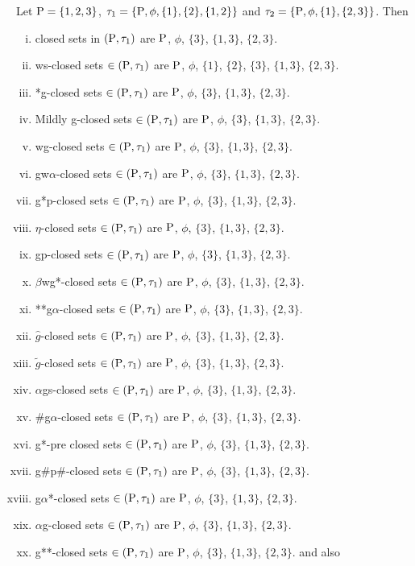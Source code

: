 \begin{exm}\label{exm2.1.8}
Let $\mathrm{P} = \{1, 2, 3\}$, $\tau_{1} = \{\mathrm{P}, \phi, \{1\}, \{2\}, \{1, 2\}\}$ and $\tau_{2} = \{\TSP, \phi, \{1\},\break \{2, 3\}\}$. Then
\begin{enumerate}[(i)]
\item closed sets in $(\mathrm{P}, \tau_{1})$ are $\mathrm{P}$, $\phi$, $\{3\}$, $\{1, 3\}$, $\{2, 3\}$.
\item ws-closed sets $\in(\mathrm{P}, \tau_{1})$ are $\mathrm{P}$, $\phi$, $\{1\}$, $\{2\}$, $\{3\}$, $\{1, 3\}$, $\{2, 3\}$.
\item *g-closed sets $\in(\mathrm{P}, \tau_{1})$ are $\mathrm{P}$, $\phi$, $\{3\}$, $\{1, 3\}$, $\{2, 3\}$.
\item Mildly g-closed sets $\in(\mathrm{P}, \tau_{1})$ are $\mathrm{P}$, $\phi$, $\{3\}$, $\{1, 3\}$, $\{2, 3\}$.
\item wg-closed sets $\in(\mathrm{P}, \tau_{1})$ are $\mathrm{P}$, $\phi$, $\{3\}$, $\{1, 3\}$, $\{2, 3\}$.
\item gw$\alpha$-closed sets $\in(\mathrm{P}, \tau_{1})$ are $\mathrm{P}$, $\phi$, $\{3\}$, $\{1, 3\}$, $\{2, 3\}$.
\item g*p-closed sets $\in(\mathrm{P}, \tau_{1})$ are $\mathrm{P}$, $\phi$, $\{3\}$, $\{1, 3\}$, $\{2, 3\}$.
\item $\eta$-closed sets $\in(\mathrm{P}, \tau_{1})$ are $\mathrm{P}$, $\phi$, $\{3\}$, $\{1, 3\}$, $\{2, 3\}$.
\item gp-closed sets $\in(\mathrm{P}, \tau_{1})$ are $\mathrm{P}$, $\phi$, $\{3\}$, $\{1, 3\}$, $\{2, 3\}$.
\item $\beta$wg*-closed sets $\in(\mathrm{P}, \tau_{1})$ are $\mathrm{P}$, $\phi$, $\{3\}$, $\{1, 3\}$, $\{2, 3\}$.
\item {*}{*}g$\alpha$-closed sets $\in(\mathrm{P}, \tau_{1})$ are $\mathrm{P}$, $\phi$, $\{3\}$, $\{1, 3\}$, $\{2, 3\}$.
\item $\hat{g}$-closed sets $\in(\mathrm{P}, \tau_{1})$ are $\mathrm{P}$, $\phi$, $\{3\}$, $\{1, 3\}$, $\{2, 3\}$.
\item $\tilde{g}$-closed sets $\in(\mathrm{P}, \tau_{1})$ are $\mathrm{P}$, $\phi$, $\{3\}$, $\{1, 3\}$, $\{2, 3\}$.
\item $\alpha$gs-closed sets $\in(\mathrm{P}, \tau_{1})$ are $\mathrm{P}$, $\phi$, $\{3\}$, $\{1, 3\}$, $\{2, 3\}$.
\item \#g$\alpha$-closed sets $\in(\mathrm{P}, \tau_{1})$ are $\mathrm{P}$, $\phi$, $\{3\}$, $\{1, 3\}$, $\{2, 3\}$.
\item g*-pre closed sets $\in(\mathrm{P}, \tau_{1} )$ are $\mathrm{P}$, $\phi$, $\{3\}$, $\{1, 3\}$, $\{2, 3\}$.
\item g\#p\#-closed sets $\in(\mathrm{P}, \tau_{1} )$ are $\mathrm{P}$, $\phi$, $\{3\}$, $\{1, 3\}$, $\{2, 3\}$.
\item g$\alpha$*-closed sets $\in(\mathrm{P}, \tau_{1} )$ are $\mathrm{P}$, $\phi$, $\{3\}$, $\{1, 3\}$, $\{2, 3\}$.
\item $\alpha$g-closed sets $\in(\mathrm{P}, \tau_{1})$ are $\mathrm{P}$, $\phi$, $\{3\}$, $\{1, 3\}$, $\{2, 3\}$.
\item g{*}{*}-closed sets $\in(\mathrm{P}, \tau_{1})$ are $\mathrm{P}$, $\phi$, $\{3\}$, $\{1, 3\}$, $\{2, 3\}$. and also
\end{enumerate}


\end{exm}
